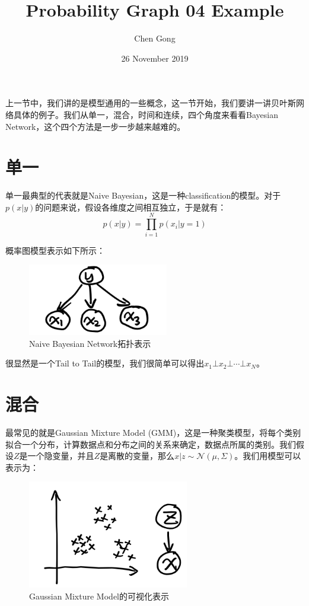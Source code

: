 \documentclass[a4paper]{article}
\title{Probability Graph 04 Example}
\author{Chen Gong}
\date{26 November 2019}
\begin{document}
\maketitle
上一节中，我们讲的是模型通用的一些概念，这一节开始，我们要讲一讲贝叶斯网络具体的例子。我们从单一，混合，时间和连续，四个角度来看看Bayesian Network，这个四个方法是一步一步越来越难的。

\section{单一}
单一最典型的代表就是Naive Bayesian，这是一种classification的模型。对于$p(x|y)$的问题来说，假设各维度之间相互独立，于是就有：
\begin{equation}
    p(x|y) = \prod_{i=1}^N p(x_i|y=1)
\end{equation}

概率图模型表示如下所示：
\begin{figure}[H]
    \centering
    \includegraphics[width=.35\textwidth]{微信图片_20191125225919.png}
    \caption{Naive Bayesian Network拓扑表示}
    \label{fig:my_label_1}
\end{figure}

很显然是一个Tail to Tail的模型，我们很简单可以得出$x_1 \bot x_2 \bot \cdots \bot x_N$。

\section{混合}
最常见的就是Gaussian Mixture Model (GMM)，这是一种聚类模型，将每个类别拟合一个分布，计算数据点和分布之间的关系来确定，数据点所属的类别。我们假设$Z$是一个隐变量，并且$Z$是离散的变量，那么$x|z \sim \mathcal{N}(\mu,\Sigma)$。我们用模型可以表示为：
\begin{figure}[H]
    \centering
    \includegraphics[width=.35\textwidth]{微信图片_20191125231235.png}
    \caption{Gaussian Mixture Model的可视化表示}
    \label{fig:my_label_1}
\end{figure}
\end{document}
